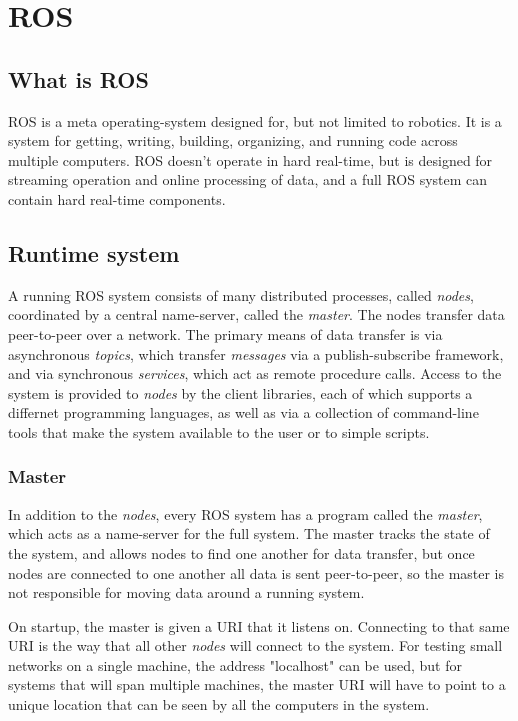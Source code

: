 \chapter {ROS}
\section{What is ROS}
ROS is a meta operating-system designed for, but not limited to robotics.  It is a system for getting, writing, building, organizing, and running code across multiple computers.  ROS doesn't operate in hard real-time, but is designed for streaming operation and online processing of data, and a full ROS system can contain hard real-time components.

\section{Runtime system}
A running ROS system consists of many distributed processes, called {\it nodes}, coordinated by a central name-server, called the {\it master}.  The nodes transfer data peer-to-peer over a network.  The primary means of data transfer is via asynchronous {\it topics}, which transfer {\it messages} via a publish-subscribe framework, and via synchronous {\it services}, which act as remote procedure calls.  Access to the system is provided to {\it nodes} by the client libraries, each of which supports a differnet programming languages, as well as via a collection of command-line tools that make the system available to the user or to simple scripts.
\subsection{Master}
In addition to the {\it nodes}, every ROS system has a program called the {\it master}, which acts as a name-server for the full system.
The master tracks the state of the system, and allows nodes to find one another for data transfer, but once nodes are connected to one another all data is sent peer-to-peer, so the master is not responsible for moving data around a running system.

On startup, the master is given a URI that it listens on.  Connecting to that same URI is the way that all other {\it nodes} will connect to the system.  For testing small networks on a single machine, the address "localhost" can be used, but for systems that will span multiple machines, the master URI will have to point to a unique location that can be seen by all the computers in the system.

